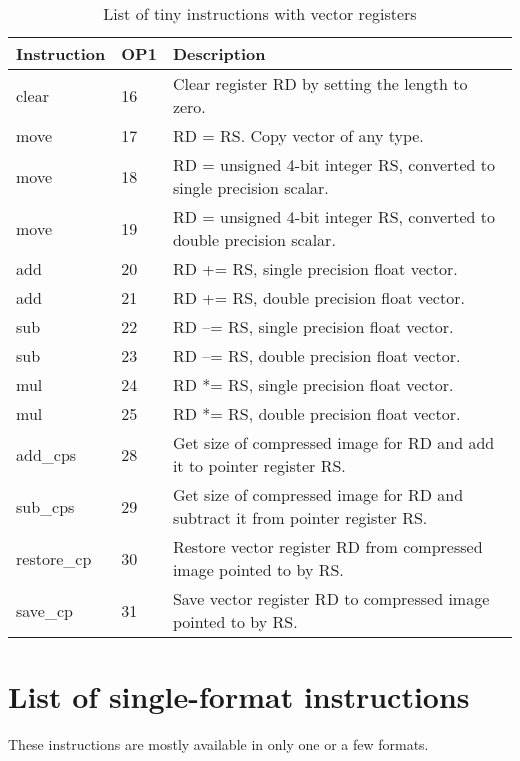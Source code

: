 \documentclass[forwardcom.tex]{subfiles}
\begin{document}
\begin{longtable} {|p{20mm}|p{8mm}|p{80mm}|}
\caption{List of tiny instructions with vector registers}
\label{table:tinyInstructionsVector}  \\
\endfirsthead
\endhead
\hline
\bfseries Instruction & \bfseries OP1 & \bfseries Description \\
\hline
clear         & 16 & Clear register RD by setting the length to zero. \\
move          & 17 & RD = RS. Copy vector of any type. \\
move          & 18 & RD = unsigned 4-bit integer RS, converted to single precision scalar. \\
move          & 19 & RD = unsigned 4-bit integer RS, converted to double precision scalar. \\
add           & 20 & RD += RS, single precision float vector. \\
add           & 21 & RD += RS, double precision float vector. \\
sub           & 22 & RD --= RS, single precision float vector. \\
sub           & 23 & RD --= RS, double precision float vector. \\
mul           & 24 & RD *= RS, single precision float vector. \\
mul           & 25 & RD *= RS, double precision float vector. \\
add\_cps      & 28 & Get size of compressed image for RD and add it to pointer register RS. \\
sub\_cps      & 29 & Get size of compressed image for RD and subtract it from pointer register RS. \\
restore\_cp   & 30 & Restore vector register RD from compressed image pointed to by RS. \\
save\_cp      & 31 & Save vector register RD to compressed image pointed to by RS. \\
\hline
\end{longtable}
\vspace{2mm}

\section{List of single-format instructions}
These instructions are mostly available in only one or a few formats.
\end{document}
